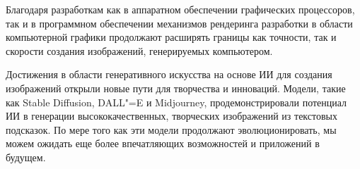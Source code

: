\documentclass[referat]{SCWorks}
\begin{document}
\conclusion
Благодаря разработкам как в аппаратном обеспечении графических процессоров, так и в программном обеспечении механизмов рендеринга разработки в области компьютерной графики продолжают расширять границы как точности, так и скорости создания изображений, генерируемых компьютером\cite{Cornell}.

Достижения в области генеративного искусства на основе ИИ для создания изображений открыли новые пути для творчества и инноваций. Модели, такие как Stable Diffusion, DALL"=E и Midjourney, продемонстрировали потенциал ИИ в генерации высококачественных, творческих изображений из текстовых подсказок. По мере того как эти модели продолжают эволюционировать, мы можем ожидать еще более впечатляющих возможностей и приложений в будущем.
%






\appendix
\end{document}

